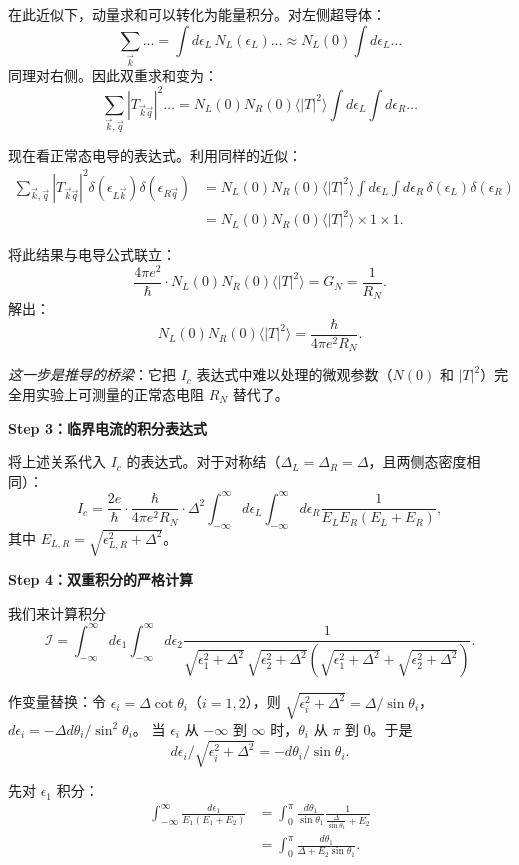 在此近似下，动量求和可以转化为能量积分。对左侧超导体：
\[
\sum_{\vec{k}} \dots = \int d\epsilon_L \, N_L(\epsilon_L) \dots \approx N_L(0) \int d\epsilon_L \dots
\]
同理对右侧。因此双重求和变为：
\[
\sum_{\vec{k},\vec{q}} |T_{\vec{k}\vec{q}}|^2 \dots = N_L(0) N_R(0) \langle |T|^2 \rangle \int d\epsilon_L \int d\epsilon_R \dots
\]

现在看正常态电导的表达式。利用同样的近似：
\begin{align*}
\sum_{\vec{k},\vec{q}} |T_{\vec{k}\vec{q}}|^2 \delta(\epsilon_{L\vec{k}}) \delta(\epsilon_{R\vec{q}})
&= N_L(0) N_R(0) \langle |T|^2 \rangle \int d\epsilon_L \int d\epsilon_R \, \delta(\epsilon_L) \delta(\epsilon_R) \\
&= N_L(0) N_R(0) \langle |T|^2 \rangle \times 1 \times 1.
\end{align*}

将此结果与电导公式联立：
\[
\frac{4\pi e^2}{\hbar} \cdot N_L(0) N_R(0) \langle |T|^2 \rangle = G_N = \frac{1}{R_N}.
\]
解出：
\[
\boxed{N_L(0) N_R(0) \langle |T|^2 \rangle = \frac{\hbar}{4\pi e^2 R_N}}.
\]

\textit{这一步是推导的桥梁}：它把 $I_c$ 表达式中难以处理的微观参数（$N(0)$ 和 $|T|^2$）完全用实验上可测量的正常态电阻 $R_N$ 替代了。

\textbf{Step 3：临界电流的积分表达式}

将上述关系代入 $I_c$ 的表达式。对于对称结（$\Delta_L = \Delta_R = \Delta$，且两侧态密度相同）：
\[
I_c = \frac{2e}{\hbar} \cdot \frac{\hbar}{4\pi e^2 R_N} \cdot \Delta^2 \int_{-\infty}^{\infty} d\epsilon_L \int_{-\infty}^{\infty} d\epsilon_R \frac{1}{E_L E_R (E_L + E_R)},
\]
其中 $E_{L,R} = \sqrt{\epsilon_{L,R}^2 + \Delta^2}$。

\textbf{Step 4：双重积分的严格计算}

我们来计算积分
\[
\mathcal{I} = \int_{-\infty}^{\infty} d\epsilon_1 \int_{-\infty}^{\infty} d\epsilon_2 \frac{1}{\sqrt{\epsilon_1^2+\Delta^2}\,\sqrt{\epsilon_2^2+\Delta^2}\left(\sqrt{\epsilon_1^2+\Delta^2} + \sqrt{\epsilon_2^2+\Delta^2}\right)}.
\]

作变量替换：令 $\epsilon_i = \Delta \cot\theta_i$（$i=1,2$），则 $\sqrt{\epsilon_i^2+\Delta^2} = \Delta/\sin\theta_i$，$d\epsilon_i = -\Delta d\theta_i/\sin^2\theta_i$。
当 $\epsilon_i$ 从 $-\infty$ 到 $\infty$ 时，$\theta_i$ 从 $\pi$ 到 $0$。于是
\[
d\epsilon_i / \sqrt{\epsilon_i^2+\Delta^2} = -d\theta_i/\sin\theta_i.
\]

先对 $\epsilon_1$ 积分：
\begin{align*}
\int_{-\infty}^{\infty} \frac{d\epsilon_1}{E_1(E_1+E_2)} &= \int_0^{\pi} \frac{d\theta_1}{\sin\theta_1} \frac{1}{\frac{\Delta}{\sin\theta_1} + E_2} \\
&= \int_0^{\pi} \frac{d\theta_1}{\Delta + E_2 \sin\theta_1}.
\end{align*}

